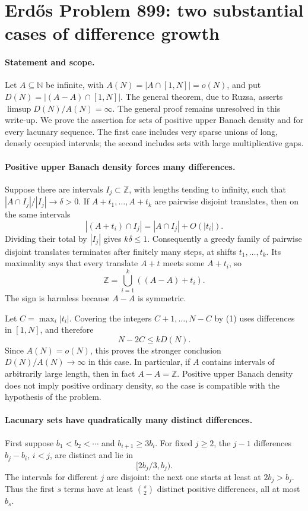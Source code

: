 \section*{Erd\H{o}s Problem 899: two substantial cases of difference growth}

\paragraph{Statement and scope.}
Let \(A\subseteq\mathbb N\) be infinite, with
\(A(N)=|A\cap[1,N]|=o(N)\), and put
\(D(N)=|(A-A)\cap[1,N]|\).
The general theorem, due to Ruzsa, asserts
\(\limsup D(N)/A(N)=\infty\).
The general proof remains unresolved in this write-up.
We prove the assertion for sets of positive upper
Banach density and for every lacunary sequence.
The first case includes very sparse unions of long,
densely occupied intervals; the second includes sets
with large multiplicative gaps.

\paragraph{Positive upper Banach density forces many differences.}
Suppose there are intervals \(I_j\subset\mathbb Z\),
with lengths tending to infinity, such that
\(|A\cap I_j|/|I_j|\to\delta>0\).
If \(A+t_1,\ldots,A+t_k\) are pairwise disjoint translates,
then on the same intervals
\[
 |(A+t_i)\cap I_j|=|A\cap I_j|+O(|t_i|).
\]
Dividing their total by \(|I_j|\) gives \(k\delta\leq1\).
Consequently a greedy family of pairwise disjoint
translates terminates after finitely many steps,
at shifts \(t_1,\ldots,t_k\).
Its maximality says that every translate \(A+t\)
meets some \(A+t_i\), so
\[
 \mathbb Z=\bigcup_{i=1}^k((A-A)+t_i).
\tag{1}
\]
The sign is harmless because \(A-A\) is symmetric.

Let \(C=\max_i|t_i|\).
Covering the integers \(C+1,\ldots,N-C\) by (1)
uses differences in \([1,N]\), and therefore
\[
 N-2C\leq kD(N).
\]
Since \(A(N)=o(N)\), this proves the stronger conclusion
\(D(N)/A(N)\to\infty\) in this case.
In particular, if \(A\) contains intervals of arbitrarily
large length, then in fact \(A-A=\mathbb Z\).
Positive upper Banach density does not imply positive
ordinary density, so the case is compatible with the
hypothesis of the problem.

\paragraph{Lacunary sets have quadratically many distinct differences.}
First suppose \(b_1<b_2<\cdots\) and \(b_{i+1}\geq3b_i\).
For fixed \(j\geq2\), the \(j-1\) differences \(b_j-b_i\),
\(i<j\), are distinct and lie in
\[
 [2b_j/3,b_j).
\]
The intervals for different \(j\) are disjoint: the
next one starts at least at \(2b_j>b_j\).
Thus the first \(s\) terms have at least
\(\binom s2\) distinct positive differences, all at
most \(b_s\).

